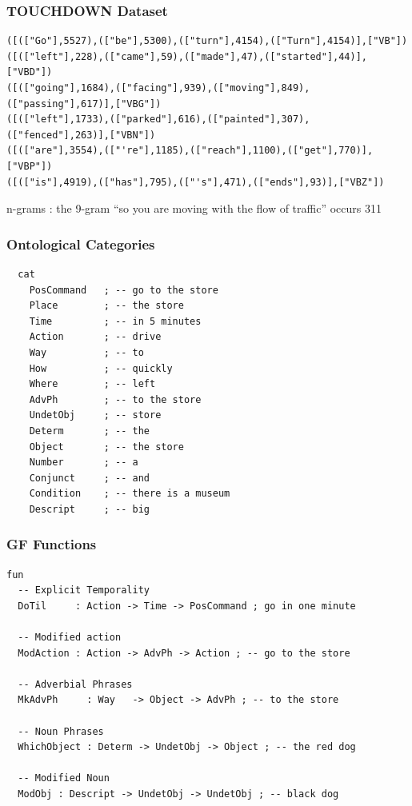 \documentclass{beamer}
\begin{document}
\begin{frame}[fragile]
\frametitle{TOUCHDOWN Dataset}


\begin{verbatim}
([(["Go"],5527),(["be"],5300),(["turn"],4154),(["Turn"],4154)],["VB"])
([(["left"],228),(["came"],59),(["made"],47),(["started"],44)],["VBD"])
([(["going"],1684),(["facing"],939),(["moving"],849),(["passing"],617)],["VBG"])
([(["left"],1733),(["parked"],616),(["painted"],307),(["fenced"],263)],["VBN"])
([(["are"],3554),(["'re"],1185),(["reach"],1100),(["get"],770)],["VBP"])
([(["is"],4919),(["has"],795),(["'s"],471),(["ends"],93)],["VBZ"])
\end{verbatim}

n-grams : the 9-gram ``so you are moving with the flow of traffic'' occurs 311

\end{frame}



\begin{frame}[fragile]
\frametitle{Ontological Categories}
\begin{verbatim}
  cat
    PosCommand   ; -- go to the store
    Place        ; -- the store
    Time         ; -- in 5 minutes
    Action       ; -- drive
    Way          ; -- to
    How          ; -- quickly
    Where        ; -- left
    AdvPh        ; -- to the store
    UndetObj     ; -- store
    Determ       ; -- the
    Object       ; -- the store
    Number       ; -- a
    Conjunct     ; -- and
    Condition    ; -- there is a museum
    Descript     ; -- big
\end{verbatim}
\end{frame}

\begin{frame}[fragile]
\frametitle{GF Functions}
\begin{verbatim}
fun
  -- Explicit Temporality
  DoTil     : Action -> Time -> PosCommand ; go in one minute

  -- Modified action
  ModAction : Action -> AdvPh -> Action ; -- go to the store

  -- Adverbial Phrases
  MkAdvPh     : Way   -> Object -> AdvPh ; -- to the store

  -- Noun Phrases
  WhichObject : Determ -> UndetObj -> Object ; -- the red dog

  -- Modified Noun
  ModObj : Descript -> UndetObj -> UndetObj ; -- black dog
\end{verbatim}
\end{frame}
\end{document}
